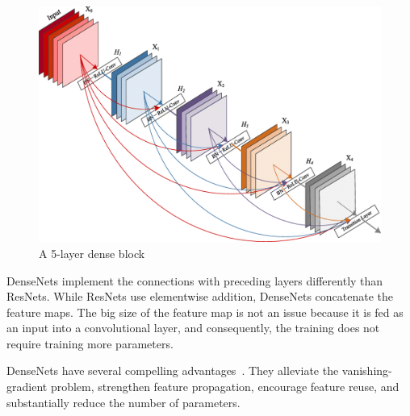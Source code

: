 \begin{figure}[H]
    \centering
    \includegraphics[width=0.9\columnwidth]{images/face-recognition/densenet.png}
    \caption{A 5-layer dense block~\cite{DenseNet}}
    \label{fig:DenseNet}
\end{figure}

DenseNets implement the connections with preceding layers differently than ResNets.
While ResNets use elementwise addition, DenseNets concatenate the feature maps.
The big size of the feature map is not an issue because it is fed as an input into a convolutional layer,
and consequently, the training does not require training more parameters.

DenseNets have several compelling advantages~\cite{DenseNet}.
They alleviate the vanishing-gradient problem, strengthen feature propagation, encourage feature reuse, and
substantially reduce the number of parameters.